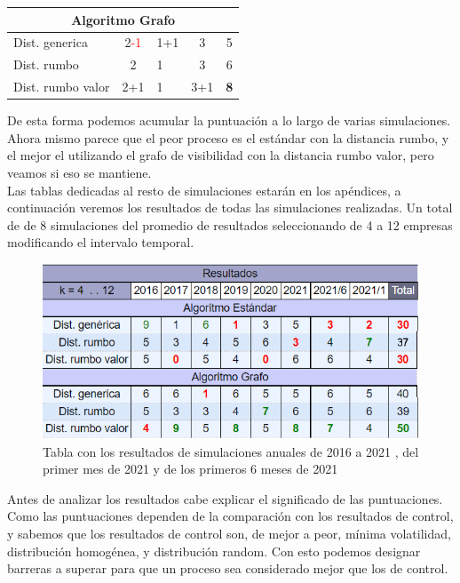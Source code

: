 \documentclass[12pt,a4paper]{article}
\begin{document}
\begin{table}[H]
\begin{tabular}{l|c|l|c|c|}
\hline
\multicolumn{5}{c}{{\cellcolor[rgb]{0.796,0.808,0.984}}Algoritmo Grafo}                                                                                                                                                \\ 
\hline
\rowcolor[rgb]{0.925,0.957,1} Dist. generica                           & 2\textcolor{red}{-1}            & 1\textcolor[rgb]{0,0.502,0}{+1} & 3                               & 5                                       \\
\rowcolor[rgb]{0.855,0.91,0.988} Dist. rumbo                           & 2                               & 1                               & 3                               & 6                                       \\
\rowcolor[rgb]{0.925,0.957,1} Dist. rumbo valor                        & 2\textcolor[rgb]{0,0.502,0}{+1} & 1                               & 3\textcolor[rgb]{0,0.502,0}{+1} & \textcolor[rgb]{0,0.502,0}{\textbf{8}} 
\end{tabular}
\end{table}
De esta forma podemos acumular la puntuación a lo largo de varias simulaciones. Ahora mismo parece que el peor proceso es el estándar con la distancia rumbo, y el mejor el utilizando el grafo de visibilidad con la distancia rumbo valor, pero veamos si eso se mantiene.\\
Las tablas dedicadas al resto de simulaciones estarán en los apéndices, a continuación veremos los resultados de todas las simulaciones realizadas. Un total de de 8 simulaciones del promedio de resultados seleccionando de 4 a 12 empresas modificando el intervalo temporal.
\begin{figure}[H]
    		\centering
    		\includegraphics[scale=0.9]{Resultados}\par
    		\caption{Tabla con los resultados de simulaciones anuales de 2016 a 2021 , del primer mes de 2021 y de los primeros 6 meses de 2021}
		\end{figure}
		Antes de analizar los resultados cabe explicar el significado de las puntuaciones. Como las puntuaciones dependen de la comparación con los resultados de control, y sabemos que los resultados de control son, de mejor a peor, mínima volatilidad, distribución homogénea, y distribución random. Con esto podemos designar barreras a superar para que un proceso sea considerado mejor que los de control.\\
\end{document}
